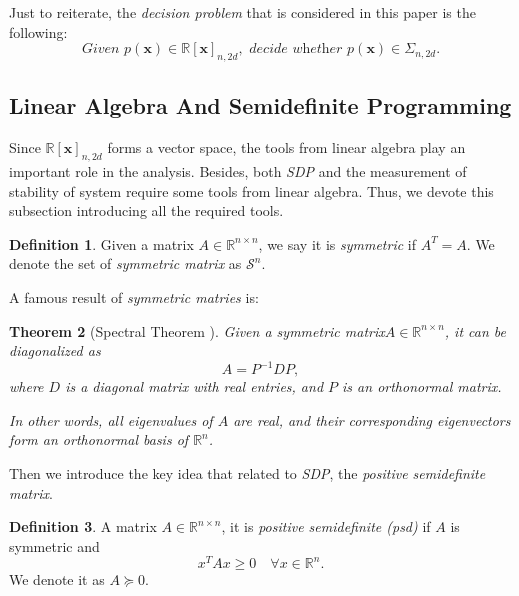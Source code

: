\documentclass[12pt]{amsart}
\numberwithin{equation}{section}
\newtheorem{thm}{Theorem}
\theoremstyle{definition}
\newtheorem{definition}[thm]{Definition}
\numberwithin{thm}{section}
\begin{document}
Just to reiterate, the \emph{decision problem} that is considered in this paper is the following: 
\begin{equation}
     \textit{Given } p(\mathbf{x}) \in \mathbb{R}[\mathbf{x}]_{n, 2d}, \textit{ decide whether } p(\mathbf{x}) \in \Sigma_{n, 2d} \label{eq:dp}.
\end{equation}




\subsection{Linear Algebra And Semidefinite Programming}
\label{Sec:Linear Algebra}

Since $\mathbb{R}[\mathbf{x}]_{n, 2d}$ forms a vector space, the tools from linear algebra play an important role in the analysis. 
Besides, both \emph{SDP} and the measurement of stability of system require some tools from linear algebra. 
Thus, we devote this subsection introducing all the required tools. 

\begin{definition}
     Given a matrix $A \in \mathbb{R}^{n \times n}$, we say it is \emph{symmetric} if $A^T = A$. We denote the set of \emph{symmetric matrix} as $\mathcal{S}^n$.  
\end{definition}

A famous result of \emph{symmetric matries} is:
\begin{thm} [Spectral Theorem \cite{golub1996matrix}]

     Given a symmetric matrix$A \in \mathbb{R}^{n \times n}$, 
     it can be diagonalized as \begin{equation*} A = P^{-1}DP, \end{equation*}
     where $D$ is a diagonal matrix with real entries, and $P$ is an orthonormal matrix.
     
     In other words, all eigenvalues of $A$ are real, and their corresponding eigenvectors form an orthonormal basis of $\mathbb{R}^n$. 
\end{thm} 

\smallskip

Then we introduce the key idea that related to \emph{SDP}, the \emph{positive semidefinite matrix}.

\begin{definition}
     A matrix $A \in \mathbb{R}^{n \times n}$, it is \emph{positive semidefinite (psd)} if $A$ is symmetric and \begin{equation*}
          x^T A x \geq 0 \quad \forall x \in \mathbb{R}^n.
     \end{equation*}
     We denote it as $A \succcurlyeq 0$.
\end{definition}
\end{document}
